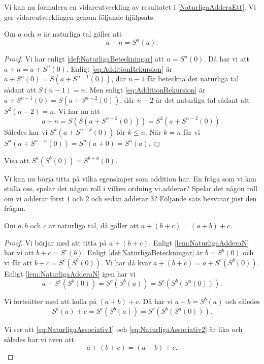 Vi kan nu formulera en vidareutveckling av resultatet 
i \cref{NaturligaAdderaEtt}.
Vi ger vidareutvecklingen genom följande hjälpsats.
\begin{lemma}\label{lem:NaturligaAdderaN}
  Om \(a\) och \(n\) är naturliga tal gäller att
  \begin{equation}
    a+n=S^n(a).
  \end{equation}
\end{lemma}
\begin{proof}
  Vi har enligt \cref{def:NaturligaBeteckningar} att \(n=S^n(0)\).
  Då har vi att \(a+n=a+S^n(0)\).
  Enligt \cref{eq:AdditionRekursion} är \(a+S^n(0) = S(a+S^{n-1}(0))\), där
  \(n-1\) får beteckna det naturliga tal sådant att \(S(n-1)=n\).
  Men enligt \cref{eq:AdditionRekursion} är \(a+S^{n-1}(0)=S(a+S^{n-2}(0))\),
  där \(n-2\) är det naturliga tal sådant att \(S^2(n-2)=n\).
  Vi har nu att \[a+n=S(S(a+S^{n-2}(0)))=S^2(a+S^{n-2}(0)).\]
  Således har vi \(S^k(a+S^{n-k}(0))\) för \(k\leq n\).
  När \(k=n\) får vi \(S^n(a+S^{n-n}(0)) = S^n(a+0) = S^n(a)\).
\end{proof}

\begin{exercise}
  Visa att \(S^a(S^b(0)) = S^{b+a}(0)\).
\end{exercise}

Vi kan nu börja titta på vilka egenskaper som addition har.
En fråga som vi kan ställa oss, spelar det någon roll i vilken ordning vi
adderar?
Spelar det någon roll om vi adderar först \(1\) och \(2\) och sedan adderar
\(3\)?
Följande sats besvarar just den frågan.
\begin{theorem}[Associativitet]\label{thm:NaturligaAssociativitet}\label{thm:NaturligaAdditionAssociativ}
  Om \(a,b\) och \(c\) är naturliga tal, då gäller att \(a+(b+c)=(a+b)+c\).
\end{theorem}
\begin{proof}
  Vi börjar med att titta på \(a+(b+c)\).
  Enligt \cref{lem:NaturligaAdderaN} har vi att \(b+c=S^c(b)\).
  Enligt \cref{def:NaturligaBeteckningar} är \(b=S^b(0)\) och vi får
  att \(b+c=S^c(S^b(0))\).
  Vi har då kvar \(a+(b+c)=a+S^c(S^b(0))\).
  Enligt \cref{lem:NaturligaAdderaN} igen har vi
  \begin{equation}\label{eq:NaturligaAssociativ1}
    a+S^c(S^b(0))=S^c(S^b(a))=S^c(S^b(S^a(0))).
  \end{equation}

  Vi fortsätter med att kolla på \((a+b)+c\).
  Då har vi \(a+b=S^b(a)\) och således
  \begin{equation}\label{eq:NaturligaAssociativ2}
    S^b(a)+c=S^c(S^b(a))=S^c(S^b(S^a(0))).
  \end{equation}

  Vi ser att \cref{eq:NaturligaAssociativ1} och
  \cref{eq:NaturligaAssociativ2} är lika och således har vi även att
  \[a+(b+c)=(a+b)+c.\]
\end{proof}

